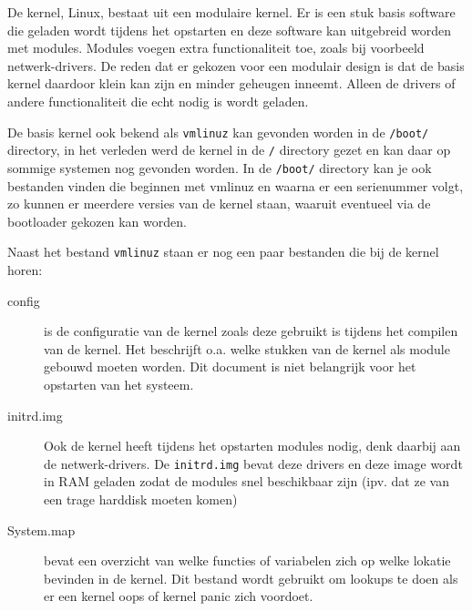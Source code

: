 De kernel, Linux, bestaat uit een modulaire kernel. Er is een stuk basis software die geladen wordt tijdens het opstarten en deze software kan uitgebreid worden met modules. Modules voegen extra functionaliteit toe, zoals bij voorbeeld netwerk-drivers. De reden dat er gekozen voor een modulair design is dat de basis kernel daardoor klein kan zijn en minder geheugen inneemt. Alleen de drivers of andere functionaliteit die echt nodig is wordt geladen.

De basis kernel ook bekend als \texttt{vmlinuz} kan gevonden worden in de \texttt{/boot/} directory, in het verleden werd de kernel in de \texttt{/} directory gezet en kan daar op sommige systemen nog gevonden worden. In de \texttt{/boot/} directory kan je ook bestanden vinden die beginnen met vmlinuz en waarna er een serienummer volgt, zo kunnen er meerdere versies van de kernel staan, waaruit eventueel via de bootloader gekozen kan worden.

Naast het bestand \texttt{vmlinuz} staan er nog een paar bestanden die bij de kernel horen:
\begin{description}
\item[config] is de configuratie van de kernel zoals deze gebruikt is tijdens het compilen van de kernel. Het beschrijft o.a. welke stukken van de kernel als module gebouwd moeten worden. Dit document is niet belangrijk voor het opstarten van het systeem.
\item[initrd.img] Ook de kernel heeft tijdens het opstarten modules nodig, denk daarbij aan de netwerk-drivers. De \texttt{initrd.img} bevat deze drivers en deze image wordt in RAM geladen zodat de modules snel beschikbaar zijn (ipv. dat ze van een trage harddisk moeten komen)
\item[System.map] bevat een overzicht van welke functies of variabelen zich op welke lokatie bevinden in de kernel. Dit bestand wordt gebruikt om lookups te doen als er een kernel oops of kernel panic zich voordoet.
\end{description}
